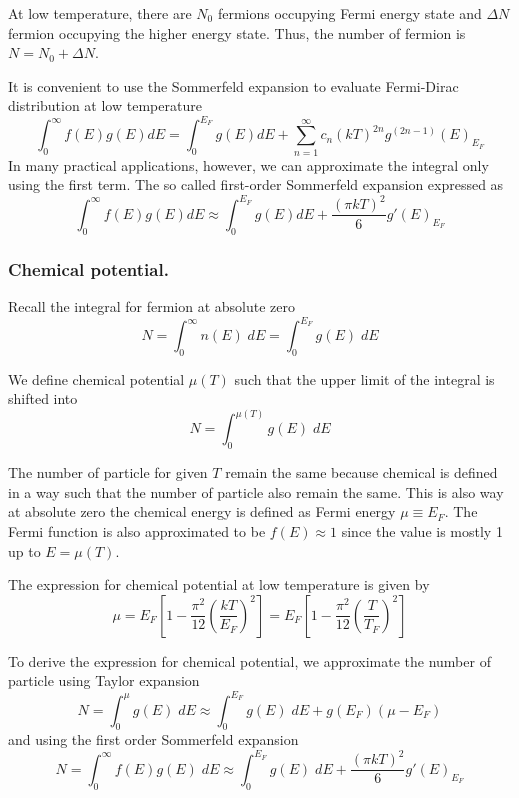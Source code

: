 \documentclass[../../../Main.tex]{subfiles}
\begin{document}
At low temperature, there are $N_0$ fermions occupying Fermi energy state and $\Delta N$ fermion occupying the higher energy state. Thus, the number of fermion is $N=N_0+\Delta N$.

It is convenient to use the Sommerfeld expansion to evaluate Fermi-Dirac distribution at low temperature
\begin{equation*}
    \int_{0}^{\infty} f(E) g(E) dE = \int_{0}^{E_F} g(E) dE + \sum_{n=1}^{\infty} c_n  (kT)^{2n}g^{(2n-1)}(E)_{E_F}
\end{equation*}
In many practical applications, however, we can approximate the integral only using the first term. The so called first-order Sommerfeld expansion expressed as 
\begin{equation*}
    \int_{0}^{\infty} f(E) g(E) dE \approx \int_{0}^{E_F} g(E) dE +  \frac{(\pi kT)^2}{6}g'(E)_{E_F}
\end{equation*}

\subsubsection*{Chemical potential.} Recall the integral for fermion at absolute zero 
\begin{equation*}
    N=\int_{0}^{\infty}n(E)\;dE=\int_{0}^{E_F}g(E)\;dE
\end{equation*}

We define chemical potential $\mu(T)$ such that the upper limit of the integral is shifted into 
\begin{equation*}
    N=\int_{0}^{\mu(T)}g(E)\;dE
\end{equation*}

The number of particle for given $T$ remain the same because chemical is defined in a way such that the number of particle also remain the same. This is also way at absolute zero the chemical energy is defined as Fermi energy $\mu\equiv E_F$. The Fermi function is also approximated to be $f(E)\approx1$ since the value is mostly 1 up to $E=\mu(T)$.

The expression for chemical potential at low temperature is given by 
\begin{equation*}
    \mu=E_F\left[1-\frac{\pi^2}{12}\left(\frac{kT}{E_F}\right)^2\right]
    =E_F\left[1-\frac{\pi^2}{12}\left(\frac{T}{T_F}\right)^2\right]
\end{equation*}

To derive the expression for chemical potential, we approximate the number of particle using Taylor expansion
\begin{equation*}
    N=\int_{0}^{\mu}g(E)\;dE\approx\int_{0}^{E_F}g(E)\;dE+g(E_F)(\mu-E_F)
\end{equation*}
and using the first order Sommerfeld expansion
\begin{equation*}
    N=\int_{0}^{\infty}f(E)g(E)\;dE\approx\int_{0}^{E_F}g(E)\;dE+ \frac{(\pi kT)^2}{6}g'(E)_{E_F}
\end{equation*}
\end{document}
